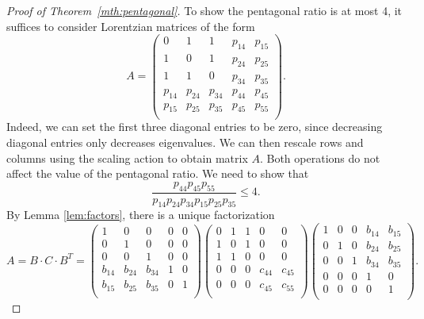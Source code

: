 \documentclass{amsart}
\theoremstyle{definition}
\theoremstyle{remark}
\begin{document}
\begin{proof}[Proof of Theorem~\ref{mth:pentagonal}]
To show the pentagonal ratio is at most 4, it suffices to consider Lorentzian matrices of the form %
\[
A=\begin{pmatrix}
0 & 1 & 1 & p_{14} & p_{15} \\
1 & 0 & 1 & p_{24} & p_{25} \\
1 & 1 & 0 & p_{34} & p_{35} \\
p_{14} & p_{24} & p_{34} & p_{44} & p_{45} \\
p_{15} & p_{25} & p_{35} & p_{45} & p_{55} \\
\end{pmatrix}.
\]
Indeed, we can set the first three diagonal entries to be zero, since decreasing diagonal entries only decreases eigenvalues. %
We can then rescale rows and columns using the scaling action to obtain matrix $A$. Both operations do not affect the value of the pentagonal ratio.
We need to show that 
\[
\frac{p_{44}p_{45}p_{55}}{p_{14}p_{24}p_{34}p_{15}p_{25}p_{35}}\leq 4.
\]
By Lemma \ref{lem:factors}, there is a unique factorization 
\[
A=B \cdot C \cdot B^{T}=\begin{pmatrix}
1 & 0 & 0 & 0 & 0 \\
0 & 1 & 0 & 0 & 0 \\
0 & 0 & 1 & 0 & 0 \\
b_{14} & b_{24} & b_{34} & 1 & 0 \\
b_{15} & b_{25} & b_{35} & 0 & 1 \\
\end{pmatrix}
\begin{pmatrix}
0 & 1 & 1 & 0 & 0 \\
1 & 0 & 1 & 0 & 0 \\
1 & 1 & 0 & 0 & 0\\
0 & 0 & 0 & c_{44} & c_{45} \\
0 & 0 & 0 & c_{45} & c_{55} \\
\end{pmatrix}
\begin{pmatrix}
1 & 0 & 0 & b_{14} & b_{15} \\
0 & 1 & 0 & b_{24} & b_{25} \\
0 & 0 & 1 & b_{34} & b_{35} \\
0 & 0 & 0 & 1 & 0 \\
0 & 0 & 0 & 0 & 1 \\
\end{pmatrix}.
\]
\end{proof}
\end{document}
